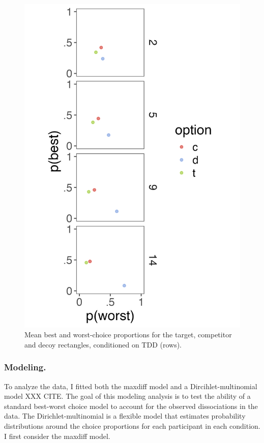  \begin{figure}
   \includegraphics[width=\linewidth]{figures/crit_mean_props_by_dist.jpeg}
   \caption{Mean best and worst-choice proportions for the target, competitor and decoy rectangles, conditioned on TDD (rows).}
   \label{fig:bw_mean_choice_collapsed}
 \end{figure}


\subsubsection{Modeling.}

To analyze the data, I fitted both the maxdiff model and a Dircihlet-multinomial model XXX CITE. The goal of this modeling analysis is to test the ability of a standard best-worst choice model to account for the observed dissociations in the data. The Dirichlet-multinomial is a flexible model that estimates probability distributions around the choice proportions for each participant in each condition. I first consider the maxdiff model.

